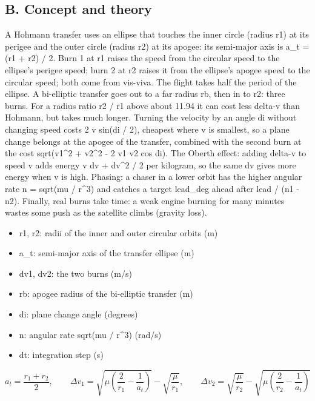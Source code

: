 \documentclass[11pt,a4paper]{article}
\begin{document}
\subsection*{B. Concept and theory}
A Hohmann transfer uses an ellipse that touches the inner circle (radius r1) at its perigee and the outer circle (radius r2) at its apogee: its semi-major axis is a\_t = (r1 + r2) / 2. Burn 1 at r1 raises the speed from the circular speed to the ellipse's perigee speed; burn 2 at r2 raises it from the ellipse's apogee speed to the circular speed; both come from vis-viva. The flight takes half the period of the ellipse. A bi-elliptic transfer goes out to a far radius rb, then in to r2: three burns. For a radius ratio r2 / r1 above about 11.94 it can cost less delta-v than Hohmann, but takes much longer. Turning the velocity by an angle di without changing speed costs 2 v sin(di / 2), cheapest where v is smallest, so a plane change belongs at the apogee of the transfer, combined with the second burn at the cost sqrt(v1\textasciicircum{}2 + v2\textasciicircum{}2 - 2 v1 v2 cos di). The Oberth effect: adding delta-v to speed v adds energy v dv + dv\textasciicircum{}2 / 2 per kilogram, so the same dv gives more energy when v is high. Phasing: a chaser in a lower orbit has the higher angular rate n = sqrt(mu / r\textasciicircum{}3) and catches a target lead\_deg ahead after lead / (n1 - n2). Finally, real burns take time: a weak engine burning for many minutes wastes some push as the satellite climbs (gravity loss).

\begin{itemize}[nosep]
\item r1, r2: radii of the inner and outer circular orbits (m)
\item a\_t: semi-major axis of the transfer ellipse (m)
\item dv1, dv2: the two burns (m/s)
\item rb: apogee radius of the bi-elliptic transfer (m)
\item di: plane change angle (degrees)
\item n: angular rate sqrt(mu / r\textasciicircum{}3) (rad/s)
\item dt: integration step (s)
\end{itemize}

\begin{equation*}
a_t=\frac{r_1+r_2}{2},\qquad \Delta v_1=\sqrt{\mu\left(\frac{2}{r_1}-\frac{1}{a_t}\right)}-\sqrt{\frac{\mu}{r_1}},\qquad \Delta v_2=\sqrt{\frac{\mu}{r_2}}-\sqrt{\mu\left(\frac{2}{r_2}-\frac{1}{a_t}\right)}
\end{equation*}
\end{document}
